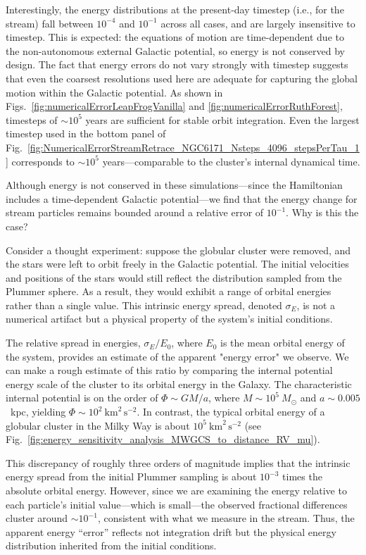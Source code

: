         Interestingly, the energy distributions at the present-day timestep (i.e., for the stream) fall between $10^{-4}$ and $10^{-1}$ across all cases, and are largely insensitive to timestep. This is expected: the equations of motion are time-dependent due to the non-autonomous external Galactic potential, so energy is not conserved by design. The fact that energy errors do not vary strongly with timestep suggests that even the coarsest resolutions used here are adequate for capturing the global motion within the Galactic potential. As shown in Figs.~\ref{fig:numericalErrorLeapFrogVanilla} and \ref{fig:numericalErrorRuthForest}, timesteps of $\sim10^5$ years are sufficient for stable orbit integration. Even the largest timestep used in the bottom panel of Fig.~\ref{fig:NumericalErrorStreamRetrace_NGC6171_Nsteps_4096_stepsPerTau_1} corresponds to $\sim10^5$ years—comparable to the cluster's internal dynamical time.

        Although energy is not conserved in these simulations—since the Hamiltonian includes a time-dependent Galactic potential—we find that the energy change for stream particles remains bounded around a relative error of $10^{-1}$. Why is this the case?

        Consider a thought experiment: suppose the globular cluster were removed, and the stars were left to orbit freely in the Galactic potential. The initial velocities and positions of the stars would still reflect the distribution sampled from the Plummer sphere. As a result, they would exhibit a range of orbital energies rather than a single value. This intrinsic energy spread, denoted $\sigma_E$, is not a numerical artifact but a physical property of the system's initial conditions.

        The relative spread in energies, $\sigma_E / E_0$, where $E_0$ is the mean orbital energy of the system, provides an estimate of the apparent "energy error" we observe. We can make a rough estimate of this ratio by comparing the internal potential energy scale of the cluster to its orbital energy in the Galaxy. The characteristic internal potential is on the order of $\Phi \sim GM/a$, where $M \sim 10^5~M_\odot$ and $a \sim 0.005$~kpc, yielding $\Phi \sim 10^2~\mathrm{km}^2\,\mathrm{s}^{-2}$. In contrast, the typical orbital energy of a globular cluster in the Milky Way is about $10^5~\mathrm{km}^2\,\mathrm{s}^{-2}$ (see Fig.~\ref{fig:energy_sensitivity_analysis_MWGCS_to_distance_RV_mu}). 

        This discrepancy of roughly three orders of magnitude implies that the intrinsic energy spread from the initial Plummer sampling is about $10^{-3}$ times the absolute orbital energy. However, since we are examining the energy relative to each particle's initial value—which is small—the observed fractional differences cluster around $\sim 10^{-1}$, consistent with what we measure in the stream. Thus, the apparent energy ``error'' reflects not integration drift but the physical energy distribution inherited from the initial conditions.


